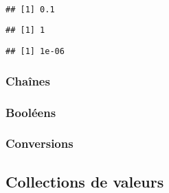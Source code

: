 \begin{knitrout}
\color{fgcolor}\begin{kframe}
\begin{flushleft}
\ttfamily\noindent
{}\hlassignement{\usebox{\hlnormalsizeboxlessthan}-}{\ }\hspace*{\fill}\\
\hlstd{}\hlassignement{\usebox{\hlnormalsizeboxlessthan}-}{\ }\hspace*{\fill}\\
\hlstd{}\hlassignement{\usebox{\hlnormalsizeboxlessthan}-}{\ }\hspace*{\fill}\\
\hlstd{}\mbox{}
\normalfont
\end{flushleft}
\begin{verbatim}
## [1] 0.1
\end{verbatim}
\begin{flushleft}
\ttfamily\noindent
{}\mbox{}
\normalfont
\end{flushleft}
\begin{verbatim}
## [1] 1
\end{verbatim}
\begin{flushleft}
\ttfamily\noindent
{}\mbox{}
\normalfont
\end{flushleft}
\begin{verbatim}
## [1] 1e-06
\end{verbatim}
\end{kframe}
\end{knitrout}


\subsubsection{Chaînes}

\subsubsection{Booléens}

\subsubsection{Conversions}

\subsection{Collections de valeurs}

